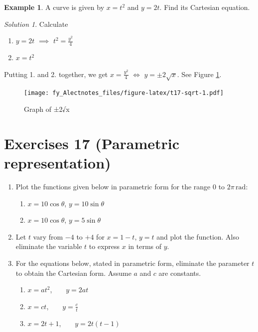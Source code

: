 \documentclass[
  12pt,
  oneside]{book}
\providecommand{\tightlist}{%
  \setlength{\itemsep}{0pt}\setlength{\parskip}{0pt}}
\theoremstyle{definition}
\theoremstyle{definition}
\newtheorem{example}{Example}[chapter]
\theoremstyle{definition}
\theoremstyle{definition}
\theoremstyle{remark}
\newtheorem*{solution}{Solution}
\begin{document}
\begin{example}
A curve is given by \(x=t^2\) and \(y=2t\). Find its Cartesian equation.
\end{example}

\begin{solution}
Calculate

\begin{enumerate}
\def\labelenumi{\arabic{enumi}.}
\tightlist
\item
  \(y=2t\) \(\implies\) \(t^2=\frac{y^2}{4}\)\\
\item
  \(x=t^2\)
\end{enumerate}

Putting 1. and 2. together, we get \(x=\frac{y^2}{4}\) \(\iff\) \(y=\pm2\sqrt{x}\). See Figure \ref{fig:t17-sqrt}.
\end{solution}

\begin{figure}
\centering
\texttt{[image: fy\_Alectnotes\_files/figure-latex/t17-sqrt-1.pdf]}
\caption{\label{fig:t17-sqrt}Graph of ±2√x}
\end{figure}

\chapter*{Exercises 17 (Parametric representation)}\label{exercises-17-parametric-representation}

\begin{enumerate}
\def\labelenumi{\arabic{enumi}.}
\item
  Plot the functions given below in parametric form for the range \(0\) to \(2\pi\,\mathrm{rad}\):

  \begin{enumerate}
  \def\labelenumii{\roman{enumii})}
  \tightlist
  \item
    \(x = 10\cos\theta\), \(y = 10\sin\theta\)
  \item
    \(x = 10\cos\theta\), \(y = 5\sin\theta\)
  \end{enumerate}
\item
  Let \(t\) vary from \(-4\) to \(+4\) for \(x = 1 - t\), \(y = t\) and plot the function. Also eliminate the variable \(t\) to express \(x\) in terms of \(y\).
\item
  For the equations below, stated in parametric form, eliminate the parameter \(t\) to obtain the Cartesian form. Assume \(a\) and \(c\) are constants.

  \begin{enumerate}
  \def\labelenumii{\roman{enumii})}
  \tightlist
  \item
    \(x = at^2\), ~ ~ \(y = 2at\)
  \item
    \(x = ct\), ~ ~ \(y=\frac{c}{t}\)
  \item
    \(x = 2t + 1\), ~ ~ \(y = 2t(t - 1)\)
  \end{enumerate}
\end{enumerate}
\end{document}
